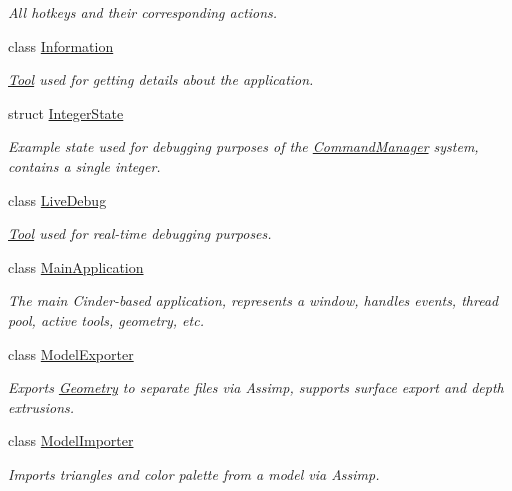 \begin{DoxyCompactItemize}
\begin{DoxyCompactList}\small\item\em All hotkeys and their corresponding actions. \end{DoxyCompactList}\item 
class \mbox{\hyperlink{classpepr3d_1_1_information}{Information}}
\begin{DoxyCompactList}\small\item\em \mbox{\hyperlink{classpepr3d_1_1_tool}{Tool}} used for getting details about the application. \end{DoxyCompactList}\item 
struct \mbox{\hyperlink{structpepr3d_1_1_integer_state}{Integer\+State}}
\begin{DoxyCompactList}\small\item\em Example state used for debugging purposes of the \mbox{\hyperlink{classpepr3d_1_1_command_manager}{Command\+Manager}} system, contains a single integer. \end{DoxyCompactList}\item 
class \mbox{\hyperlink{classpepr3d_1_1_live_debug}{Live\+Debug}}
\begin{DoxyCompactList}\small\item\em \mbox{\hyperlink{classpepr3d_1_1_tool}{Tool}} used for real-\/time debugging purposes. \end{DoxyCompactList}\item 
class \mbox{\hyperlink{classpepr3d_1_1_main_application}{Main\+Application}}
\begin{DoxyCompactList}\small\item\em The main Cinder-\/based application, represents a window, handles events, thread pool, active tools, geometry, etc. \end{DoxyCompactList}\item 
class \mbox{\hyperlink{classpepr3d_1_1_model_exporter}{Model\+Exporter}}
\begin{DoxyCompactList}\small\item\em Exports \mbox{\hyperlink{classpepr3d_1_1_geometry}{Geometry}} to separate files via Assimp, supports surface export and depth extrusions. \end{DoxyCompactList}\item 
class \mbox{\hyperlink{classpepr3d_1_1_model_importer}{Model\+Importer}}
\begin{DoxyCompactList}\small\item\em Imports triangles and color palette from a model via Assimp. \end{DoxyCompactList}\item 

\end{DoxyCompactItemize}
